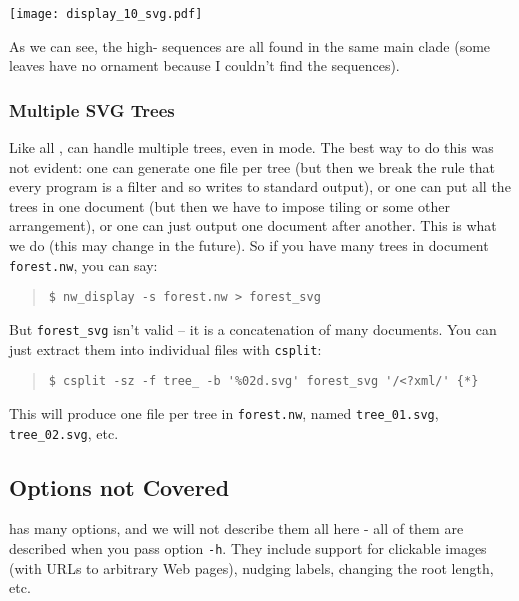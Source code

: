 
\texttt{[image: display\_10\_svg.pdf]}
\bigskip{}

\noindent{}As we can see, the high-\gc{} sequences are all found in the same
main clade (some leaves have no ornament because I couldn't find the sequences).

\subsubsection{Multiple SVG Trees}

Like all \nutils, \display{} can handle multiple trees, even in \svg{} mode.
The best way to do this was not evident: one can generate one file per tree (but
then we break the rule that every program is a filter and so writes to standard
output), or one can put all the trees in one \svg{} document (but then we have
to impose tiling or some other arrangement), or one can just output one \svg{}
document after another. This is what we do (this may change in the future). So
if you have many trees in document \texttt{forest.nw}, you can say:
\begin{quote}
\verb+$ nw_display -s forest.nw > forest_svg+
\end{quote}
But \texttt{forest\_svg} isn't valid \svg{} -- it is a concatenation of many \svg{} documents. You can just extract them into individual files with \texttt{csplit}:
\begin{quote}
\verb+$ csplit -sz -f tree_ -b '%02d.svg' forest_svg '/<?xml/' {*}+
\end{quote}
This will produce one \svg{} file per tree in \texttt{forest.nw}, named \texttt{tree\_01.svg}, \texttt{tree\_02.svg}, etc.

\subsection{Options not Covered}

\display{} has many options, and we will not describe them all here - all of
them are described when you pass option \texttt{-h}. They include support for
clickable images (with URLs to arbitrary Web pages), nudging labels, changing
the root length, etc. 
